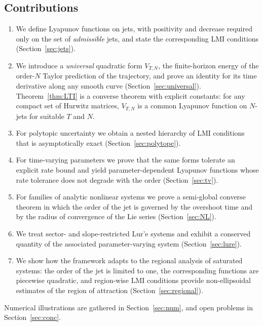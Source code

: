 \documentclass[preprint,12pt,authoryear]{elsarticle}
\theoremstyle{definition}
\theoremstyle{remark}
\begin{document}
\subsection{Contributions}
\begin{enumerate}[nosep,label=(\roman*)]
\item We define Lyapunov functions on jets, with positivity and decrease required only on the set of \emph{admissible} jets, and state the corresponding LMI conditions (Section~\ref{sec:jets}).
\item We introduce a \emph{universal} quadratic form $V_{T,N}$, the finite-horizon energy of the order-$N$ Taylor prediction of the trajectory, and prove an identity for its time derivative along any smooth curve (Section~\ref{sec:universal}). Theorem~\ref{thm:LTI} is a converse theorem with explicit constants: for any compact set of Hurwitz matrices, $V_{T,N}$ is a common Lyapunov function on $N$-jets for suitable $T$ and $N$.
\item For polytopic uncertainty we obtain a nested hierarchy of LMI conditions that is asymptotically exact (Section~\ref{sec:polytope}).
\item For time-varying parameters we prove that the same forms tolerate an explicit rate bound and yield parameter-dependent Lyapunov functions whose rate tolerance does not degrade with the order (Section~\ref{sec:tv}).
\item For families of analytic nonlinear systems we prove a semi-global converse theorem in which the order of the jet is governed by the overshoot time and by the radius of convergence of the Lie series (Section~\ref{sec:NL}).
\item We treat sector- and slope-restricted Lur'e systems and exhibit a conserved quantity of the associated parameter-varying system (Section~\ref{sec:lure}).
\item We show how the framework adapts to the regional analysis of saturated systems: the order of the jet is limited to one, the corresponding functions are piecewise quadratic, and region-wise LMI conditions provide non-ellipsoidal estimates of the region of attraction (Section~\ref{sec:regional}).
\end{enumerate}
Numerical illustrations are gathered in Section~\ref{sec:num}, and open problems in Section~\ref{sec:conc}.
\end{document}
